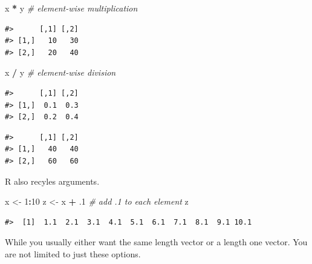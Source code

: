 \documentclass[]{book}
\newenvironment{Shaded}{\begin{snugshade}}{\end{snugshade}}
\newcommand{\DecValTok}[1]{\textcolor[rgb]{0.00,0.00,0.81}{#1}}
\newcommand{\StringTok}[1]{\textcolor[rgb]{0.31,0.60,0.02}{#1}}
\newcommand{\CommentTok}[1]{\textcolor[rgb]{0.56,0.35,0.01}{\textit{#1}}}
\newcommand{\OperatorTok}[1]{\textcolor[rgb]{0.81,0.36,0.00}{\textbf{#1}}}
\newcommand{\NormalTok}[1]{#1}
\theoremstyle{definition}
\theoremstyle{definition}
\theoremstyle{definition}
\theoremstyle{remark}
\begin{document}
\begin{Shaded}
\begin{Highlighting}[]
\NormalTok{x }\OperatorTok{*}\StringTok{ }\NormalTok{y  }\CommentTok{# element-wise multiplication}
\end{Highlighting}
\end{Shaded}

\begin{verbatim}
#>      [,1] [,2]
#> [1,]   10   30
#> [2,]   20   40
\end{verbatim}

\begin{Shaded}
\begin{Highlighting}[]
\NormalTok{x }\OperatorTok{/}\StringTok{ }\NormalTok{y  }\CommentTok{# element-wise division}
\end{Highlighting}
\end{Shaded}

\begin{verbatim}
#>      [,1] [,2]
#> [1,]  0.1  0.3
#> [2,]  0.2  0.4
\end{verbatim}

\begin{Shaded}
\end{Shaded}

\begin{verbatim}
#>      [,1] [,2]
#> [1,]   40   40
#> [2,]   60   60
\end{verbatim}

R also recyles arguments.

\begin{Shaded}
\begin{Highlighting}[]
\NormalTok{x <-}\StringTok{ }\DecValTok{1}\OperatorTok{:}\DecValTok{10}
\NormalTok{z <-}\StringTok{ }\NormalTok{x }\OperatorTok{+}\StringTok{ }\NormalTok{.}\DecValTok{1}  \CommentTok{# add .1 to each element}
\NormalTok{z}
\end{Highlighting}
\end{Shaded}

\begin{verbatim}
#>  [1]  1.1  2.1  3.1  4.1  5.1  6.1  7.1  8.1  9.1 10.1
\end{verbatim}

While you usually either want the same length vector or a length one
vector. You are not limited to just these options.
\end{document}
